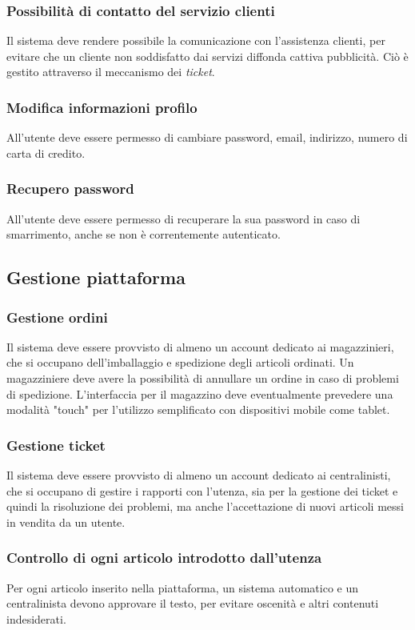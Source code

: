 \documentclass[12pt,a4paper]{article}
\begin{document}
\subsubsection{Possibilità di contatto del servizio clienti}
Il sistema deve rendere possibile la comunicazione con l'assistenza clienti, per evitare che un cliente non soddisfatto dai servizi diffonda cattiva pubblicità. Ciò è gestito attraverso il meccanismo dei \textit{ticket}.

\subsubsection{Modifica informazioni profilo}
All'utente deve essere permesso di cambiare password, email, indirizzo, numero di carta di credito.

\subsubsection{Recupero password}
All'utente deve essere permesso di recuperare la sua password in caso di smarrimento, anche se non è correntemente autenticato.

\subsection{Gestione piattaforma}

\subsubsection{Gestione ordini}
Il sistema deve essere provvisto di almeno un account dedicato ai magazzinieri, che si occupano dell'imballaggio e spedizione degli articoli ordinati. Un magazziniere deve avere la possibilità di annullare un ordine in caso di problemi di spedizione. L'interfaccia per il magazzino deve eventualmente prevedere una modalità "touch" per l'utilizzo semplificato con dispositivi mobile come tablet.

\subsubsection{Gestione ticket}
Il sistema deve essere provvisto di almeno un account dedicato ai centralinisti, che si occupano di gestire i rapporti con l'utenza, sia per la gestione dei ticket e quindi la risoluzione dei problemi, ma anche l'accettazione di nuovi articoli messi in vendita da un utente.

\subsubsection{Controllo di ogni articolo introdotto dall'utenza}
Per ogni articolo inserito nella piattaforma, un sistema automatico e un centralinista devono approvare il testo, per evitare oscenità e altri contenuti indesiderati.
\end{document}
